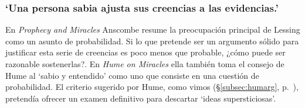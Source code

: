 \subsubsection{\enquote*{Una persona sabia ajusta sus creencias a las evidencias.}}

En \emph{Prophecy and Miracles} Anscombe resume la preocupación principal de Lessing como un asunto de probabilidad. Si lo que pretende ser un argumento sólido para justificar esta serie de creencias es poco menos que probable, ¿cómo puede ser razonable sostenerlas?. En \emph{Hume on Miracles} ella también toma el consejo de Hume al `sabio y entendido' como uno que consiste en una cuestión de probabilidad. El criterio sugerido por Hume, como vimos (\S\ref{subsec:humarg}, p.~\pageref{subsec:humarg}),
pretendía ofrecer un examen definitivo para descartar `ideas supersticiosas'.
